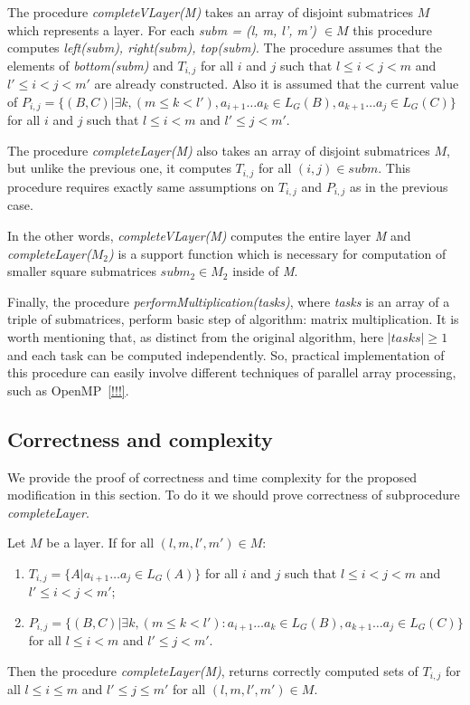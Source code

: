 The procedure \textit{completeVLayer(M)} takes an array of disjoint submatrices $M$ which represents a layer.
For each \textit{subm = (l, m, l', m') $\in M$} this procedure computes \textit{left(subm), right(subm), top(subm)}.
The procedure assumes that the elements of \textit{bottom(subm)} and $T_{i, j}$ for all $i$ and $j$ such that $l \leq i < j < m$ and $  l' \leq i < j < m'$ are already constructed.
Also it is assumed that the current value of
$P_{i, j} =  \{ (B, C) | \exists k, (m \le k < l'), a_{i + 1} \dots a_{k} \in L_G(B), a_{k + 1} \dots a_{j} \in L_G(C)\} $ for all $i$ and $j$ such that $l \leq i < m$ and $l' \leq j < m'$.

The procedure \textit{completeLayer(M)} also takes an array of disjoint submatrices $M$, but unlike the previous one, it computes $T_{i, j}$ for all $(i, j) \in subm$.
This procedure requires exactly same assumptions on $T_{i, j}$  and $P_{i, j}$  as in the previous case.

In the other words, \textit{completeVLayer(M)} computes the entire layer \textit{M} \linebreak and \textit{completeLayer($M_{2}$)} is a support function which is necessary for computation of smaller square submatrices $subm_{2} \in M_{2}$ inside of \textit{M}.  

Finally, the procedure \textit{performMultiplication(tasks)}, where \textit{tasks} is an array of a triple of submatrices, perform basic step of algorithm: matrix multiplication. It is worth mentioning that, as distinct from the original algorithm, here $|tasks| \ge 1$ and each task can be computed independently.
So, practical implementation of this procedure can easily involve different techniques of parallel array processing, such as OpenMP~\ref{!!!}.


\subsection{Correctness and complexity}

We provide the proof of correctness and time complexity for the proposed modification in this section.
To do it we should prove correctness of subprocedure \textit{completeLayer}.

\begin{theorem}
Let $M$ be a layer. If for all $(l, m, l', m') \in M$:
\begin{enumerate}
  \item $T_{i, j} = \{ A |  a_{i + 1} \dots a_{j} \in L_G(A)\}$ for all $i$ and $j$ such that $l \leq i < j < m$ and $l' \leq i < j < m'$;
  \item $P_{i, j} =  \{ (B, C) |\exists k, (m \le k < l'): a_{i + 1} \dots a_{k} \in L_G(B), a_{k + 1} \dots a_{j} \in L_G(C)\}$ for all $l \leq i < m$ and $l' \leq j < m'$.
\end{enumerate}

Then the procedure \textit{completeLayer(M)}, returns correctly computed sets of $T_{i, j}$ for all $l \leq i \le m$ and $l' \leq j \le m'$ for all $(l, m, l', m') \in M$.
\end{theorem}

